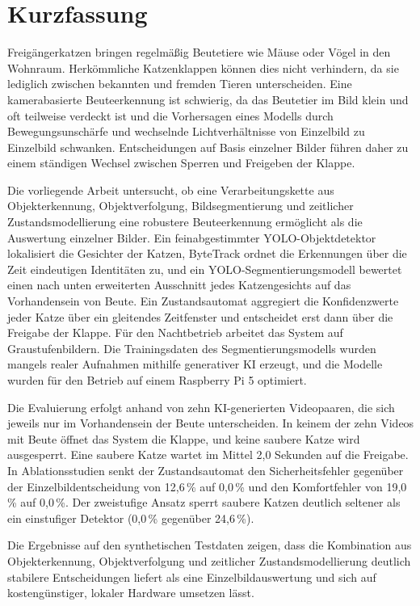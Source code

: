 \chapter{Kurzfassung}

Freigängerkatzen bringen regelmäßig Beutetiere wie Mäuse oder Vögel in den Wohnraum. Herkömmliche Katzenklappen können dies nicht verhindern, da sie lediglich zwischen bekannten und fremden Tieren unterscheiden. Eine kamerabasierte Beuteerkennung ist schwierig, da das Beutetier im Bild klein und oft teilweise verdeckt ist und die Vorhersagen eines Modells durch Bewegungsunschärfe und wechselnde Lichtverhältnisse von Einzelbild zu Einzelbild schwanken. Entscheidungen auf Basis einzelner Bilder führen daher zu einem ständigen Wechsel zwischen Sperren und Freigeben der Klappe.

Die vorliegende Arbeit untersucht, ob eine Verarbeitungskette aus Objekterkennung, Objektverfolgung, Bildsegmentierung und zeitlicher Zustandsmodellierung eine robustere Beuteerkennung ermöglicht als die Auswertung einzelner Bilder. Ein feinabgestimmter YOLO-Objektdetektor lokalisiert die Gesichter der Katzen, ByteTrack ordnet die Erkennungen über die Zeit eindeutigen Identitäten zu, und ein YOLO-Segmentierungsmodell bewertet einen nach unten erweiterten Ausschnitt jedes Katzengesichts auf das Vorhandensein von Beute. Ein Zustandsautomat aggregiert die Konfidenzwerte jeder Katze über ein gleitendes Zeitfenster und entscheidet erst dann über die Freigabe der Klappe. Für den Nachtbetrieb arbeitet das System auf Graustufenbildern. Die Trainingsdaten des Segmentierungsmodells wurden mangels realer Aufnahmen mithilfe generativer KI erzeugt, und die Modelle wurden für den Betrieb auf einem Raspberry Pi 5 optimiert.

Die Evaluierung erfolgt anhand von zehn KI-generierten Videopaaren, die sich jeweils nur im Vorhandensein der Beute unterscheiden. In keinem der zehn Videos mit Beute öffnet das System die Klappe, und keine saubere Katze wird ausgesperrt. Eine saubere Katze wartet im Mittel 2,0 Sekunden auf die Freigabe. In Ablationsstudien senkt der Zustandsautomat den Sicherheitsfehler gegenüber der Einzelbildentscheidung von 12,6\,\% auf 0,0\,\% und den Komfortfehler von 19,0\,\% auf 0,0\,\%. Der zweistufige Ansatz sperrt saubere Katzen deutlich seltener als ein einstufiger Detektor (0,0\,\% gegenüber 24,6\,\%).

Die Ergebnisse auf den synthetischen Testdaten zeigen, dass die Kombination aus Objekterkennung, Objektverfolgung und zeitlicher Zustandsmodellierung deutlich stabilere Entscheidungen liefert als eine Einzelbildauswertung und sich auf kostengünstiger, lokaler Hardware umsetzen lässt.
